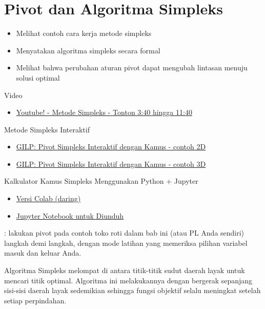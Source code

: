 \section{Pivot dan Algoritma Simpleks}
\label{sec:pivoting}
\begin{outcome}
\begin{itemize}
\item Melihat contoh cara kerja metode simpleks
\item Menyatakan algoritma simpleks secara formal
\item Melihat bahwa perubahan aturan pivot dapat mengubah lintasan menuju solusi optimal
\end{itemize}
\end{outcome}
\begin{resource}
Video
\begin{itemize}
\item \href{https://youtu.be/E72DWgKP_1Y?si=LTPKmJpNy4zRX-7q&t=216}{Youtube! - Metode Simpleks - Tonton 3:40 hingga 11:40} 
\end{itemize}
Metode Simpleks Interaktif
\begin{itemize}
\item \href{https://gilp.henryrobbins.com/en/latest/examples/2d/ALL_INTEGER_2D_LP.html}{GILP: Pivot Simpleks Interaktif dengan Kamus - contoh 2D}
\item \href{https://gilp.henryrobbins.com/en/latest/examples/3d/ALL_INTEGER_3D_LP.html}{GILP: Pivot Simpleks Interaktif dengan Kamus - contoh 3D}
\end{itemize}
Kalkulator Kamus Simpleks Menggunakan Python + Jupyter
\begin{itemize}
\item \href{https://colab.research.google.com/drive/1kUWeNOVZByIoSWWUEUEFwwdFhAQvGcsG?usp=sharing}{Versi Colab (daring)}
\item \href{https://github.com/open-optimization/open-optimization-or-examples/blob/master/linear-programming/Simplex_Tableaus_From_Basis.ipynb}{Jupyter Notebook untuk Diunduh}
\end{itemize}
\end{resource}
\begin{tryit}
: lakukan pivot pada contoh toko roti dalam bab ini (atau PL Anda sendiri) langkah demi langkah, dengan mode latihan yang memeriksa pilihan variabel masuk dan keluar Anda.
\end{tryit}

Algoritma Simpleks melompat di antara titik-titik sudut daerah layak untuk mencari titik optimal.
Algoritma ini melakukannya dengan bergerak sepanjang sisi-sisi daerah layak sedemikian sehingga fungsi objektif selalu meningkat setelah setiap perpindahan.

